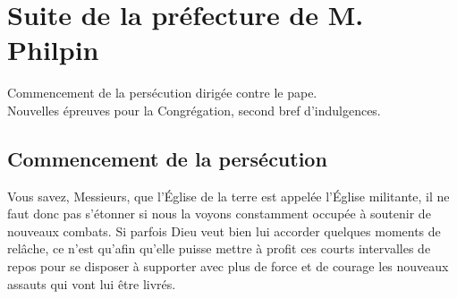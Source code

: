 \chapter{Suite de la préfecture de M. Philpin}
\begin{center}
Commencement de la persécution dirigée contre le pape.\\
Nouvelles épreuves pour la Congrégation, second bref d'indulgences.
\end{center}

\section*{Commencement de la persécution}
Vous savez, Messieurs, que l'Église de la terre est appelée l'Église militante, il ne faut donc pas s'étonner si nous la voyons constamment occupée à soutenir de nouveaux combats. Si parfois Dieu veut bien lui accorder quelques moments de relâche, ce n'est qu'afin qu'elle puisse mettre à profit ces courts intervalles de repos pour se disposer à supporter avec plus de force et de courage les nouveaux assauts qui vont lui être livrés.

